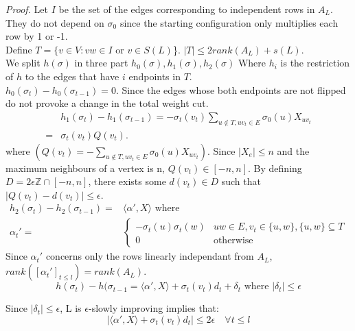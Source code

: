 \documentclass[12pt]{article}
\begin{document}
\textit{Proof.} Let $I$ be the set of the edges corresponding to independent rows in $A_L$. They do not depend on $\sigma_0$ since the starting configuration only multiplies each row by 1 or -1.\\
Define $T = \{v \in V: vw \in I \text{ or } v \in S(L)$\}. $|T| \leq 2 rank(A_L) + s(L)$. \\
We split $h(\sigma)$ in three part $h_0(\sigma), h_1(\sigma), h_2(\sigma)$ Where $h_i$ is the restriction of $h$ to the edges that have $i$ endpoints in $T$. \\
$h_0(\sigma_t) - h_0(\sigma_{t -1}) = 0$. Since the edges whose both endpoints are not flipped do not provoke a change in the total weight cut. \\
\begin{equation*}
\begin{split}
&h_1(\sigma_t) - h_1(\sigma_{t-1}) = -\sigma_t(v_t)\sum_{u \not\in T, uv_t \in E}\sigma_0(u)X_{uv_t} \\
=& \sigma_t(v_t)Q(v_t).
\end{split}
\end{equation*}
where $(Q(v_t) = -\sum_{u \not\in T, uv_t \in E}\sigma_0(u)X_{uv_t})$. Since $|X_e| \leq n$ and the maximum neighbours of a vertex is n, $Q(v_t) \in [-n, n]$. By defining $D = 2\epsilon\mathbb Z \cap [-n, n]$, there exists some $d(v_t) \in D$ such that $|Q(v_t) - d(v_t)| \leq \epsilon$.\\
\begin{equation*}
\begin{split}
h_2(\sigma_t) - h_2(\sigma_{t-1}) = &\langle\alpha ', X \rangle \text{ where }\\
\alpha_t ' =  &
\begin{cases}
-\sigma_t(u)\sigma_t(w) & uw \in E, v_t \in \{u, w\}, \{u, w\} \subseteq T \\
0 & \text{otherwise}
\end{cases}
\end{split}
\end{equation*}
Since $\alpha_t'$ concerns only the rows linearly independant from $A_L$, $rank([\alpha_t']_{t \leq l}) = rank(A_L)$. \\
\begin{equation*}
h(\sigma_t) - h(\sigma_{t-1} = \langle\alpha ', X \rangle +   \sigma_t(v_t)d_t + \delta_t \text{    where }|\delta_t| \leq \epsilon
\end{equation*}

Since  $|\delta_t| \leq \epsilon$, L is $\epsilon$-slowly improving implies that: 
\begin{equation*}
| \langle\alpha ', X \rangle +   \sigma_t(v_t)d_t| \leq 2\epsilon \quad \forall t \leq l
\end{equation*}
\end{document}
